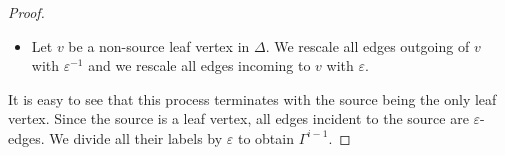 \documentclass[10pt,a4paper]{article}
\begin{document}
\begin{proof}
\begin{itemize}
\item Let $v$ be a non-source leaf vertex in $\Delta$. We rescale all edges outgoing of $v$ with $\varepsilon^{-1}$ and we rescale all edges incoming to $v$ with $\varepsilon$.
\end{itemize}
It is easy to see that this process terminates with the source being the only leaf vertex. Since the source is a leaf vertex, all edges incident to the source are $\varepsilon$-edges. We divide all their labels by $\varepsilon$ to obtain $\Gamma^{i-1}$.
\end{proof}
\end{document}
